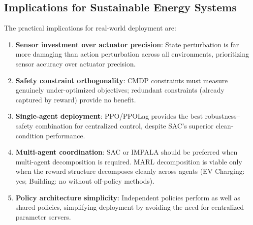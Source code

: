 \subsection{Implications for Sustainable Energy Systems}

The practical implications for real-world deployment are:

\begin{enumerate}
    \item \textbf{Sensor investment over actuator precision}: State perturbation is far more damaging than action perturbation across all environments, prioritizing sensor accuracy over actuator precision.
    \item \textbf{Safety constraint orthogonality}: CMDP constraints must measure genuinely under-optimized objectives; redundant constraints (already captured by reward) provide no benefit.
    \item \textbf{Single-agent deployment}: PPO/PPOLag provides the best robustness--safety combination for centralized control, despite SAC's superior clean-condition performance.
    \item \textbf{Multi-agent coordination}: SAC or IMPALA should be preferred when multi-agent decomposition is required. MARL decomposition is viable only when the reward structure decomposes cleanly across agents (EV Charging: yes; Building: no without off-policy methods).
    \item \textbf{Policy architecture simplicity}: Independent policies perform as well as shared policies, simplifying deployment by avoiding the need for centralized parameter servers.
\end{enumerate}
